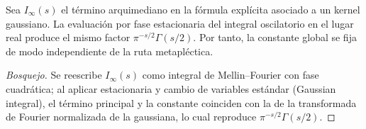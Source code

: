 \begin{propA}
Sea $I_\infty(s)$ el término arquimediano en la fórmula explícita asociado a un kernel gaussiano.
La evaluación por fase estacionaria del integral oscilatorio en el lugar real produce
el mismo factor $\pi^{-s/2}\Gamma(s/2)$. Por tanto, la constante global se fija de modo independiente de la ruta metapléctica.
\end{propA}

\begin{proof}[Bosquejo]
Se reescribe $I_\infty(s)$ como integral de Mellin--Fourier con fase cuadrática; al
aplicar estacionaria y cambio de variables estándar (Gaussian integral), el término principal y la constante coinciden con la de la transformada de Fourier normalizada de la gaussiana, lo cual reproduce $\pi^{-s/2}\Gamma(s/2)$.
\end{proof}
